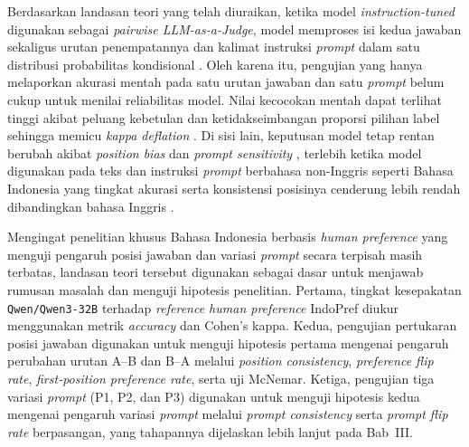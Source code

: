 Berdasarkan landasan teori yang telah diuraikan, ketika model \textit{instruction-tuned} digunakan sebagai \textit{pairwise LLM-as-a-Judge}, model memproses isi kedua jawaban sekaligus urutan penempatannya dan kalimat instruksi \textit{prompt} dalam satu distribusi probabilitas kondisional \cite{guSurveyLLMasaJudge2025}\cite{liLLMsasJudgesComprehensiveSurvey2024}. Oleh karena itu, pengujian yang hanya melaporkan akurasi mentah pada satu urutan jawaban dan satu \textit{prompt} belum cukup untuk menilai reliabilitas model. Nilai kecocokan mentah dapat terlihat tinggi akibat peluang kebetulan dan ketidakseimbangan proporsi pilihan label \cite{raoAgreementMetricsLLMasJudge2026} sehingga memicu \textit{kappa deflation} \cite{normanReliabilityValiditySystematic2026}. Di sisi lain, keputusan model tetap rentan berubah akibat \textit{position bias} \cite{shiJudgingJudgesSystematic}\cite{anghelDiagnosingBiasInstability2025} dan \textit{prompt sensitivity} \cite{weiSystematicEvaluationLLMasaJudge2025}\cite{bellibatluJudgeSenseBenchmarkPrompt2026}, terlebih ketika model digunakan pada teks dan instruksi \textit{prompt} berbahasa non-Inggris seperti Bahasa Indonesia yang tingkat akurasi serta konsistensi posisinya cenderung lebih rendah dibandingkan bahasa Inggris \cite{fuHowReliableMultilingual2025}\cite{wiyonoIndoPrefMultiDomainPairwise2025}\cite{yinDoesJudgePrefer2026}.

Mengingat penelitian khusus Bahasa Indonesia berbasis \textit{human preference} yang menguji pengaruh posisi jawaban dan variasi \textit{prompt} secara terpisah masih terbatas, landasan teori tersebut digunakan sebagai dasar untuk menjawab rumusan masalah dan menguji hipotesis penelitian. Pertama, tingkat kesepakatan \texttt{Qwen/Qwen3-32B} terhadap \textit{reference human preference} IndoPref diukur menggunakan metrik \textit{accuracy} dan Cohen's kappa. Kedua, pengujian pertukaran posisi jawaban digunakan untuk menguji hipotesis pertama mengenai pengaruh perubahan urutan A--B dan B--A melalui \textit{position consistency}, \textit{preference flip rate}, \textit{first-position preference rate}, serta uji McNemar. Ketiga, pengujian tiga variasi \textit{prompt} (P1, P2, dan P3) digunakan untuk menguji hipotesis kedua mengenai pengaruh variasi \textit{prompt} melalui \textit{prompt consistency} serta \textit{prompt flip rate} berpasangan, yang tahapannya dijelaskan lebih lanjut pada Bab~III.

\newpage

